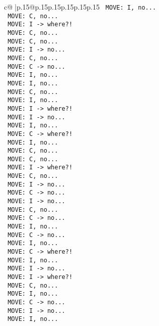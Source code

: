 \documentclass{article}
\begin{document}
{\begin{supertabular}{c@{$\;$}|p{.15\linewidth}@{}p{.15\linewidth}p{.15\linewidth}p{.15\linewidth}p{.15\linewidth}p{.15\linewidth}}
{{{\texttt{ MOVE: I, no...} \\
\texttt{ MOVE: C, no...} \\
\texttt{ MOVE: I {-}> where?!} \\
\texttt{ MOVE: C, no...} \\
\texttt{ MOVE: C, no...} \\
\texttt{ MOVE: I {-}> no...} \\
\texttt{ MOVE: C, no...} \\
\texttt{ MOVE: C {-}> no...} \\
\texttt{ MOVE: I, no...} \\
\texttt{ MOVE: I, no...} \\
\texttt{ MOVE: C, no...} \\
\texttt{ MOVE: I, no...} \\
\texttt{ MOVE: I {-}> where?!} \\
\texttt{ MOVE: I {-}> no...} \\
\texttt{ MOVE: I, no...} \\
\texttt{ MOVE: C {-}> where?!} \\
\texttt{ MOVE: I, no...} \\
\texttt{ MOVE: C, no...} \\
\texttt{ MOVE: C, no...} \\
\texttt{ MOVE: I {-}> where?!} \\
\texttt{ MOVE: C, no...} \\
\texttt{ MOVE: I {-}> no...} \\
\texttt{ MOVE: C {-}> no...} \\
\texttt{ MOVE: I {-}> no...} \\
\texttt{ MOVE: C, no...} \\
\texttt{ MOVE: C {-}> no...} \\
\texttt{ MOVE: I, no...} \\
\texttt{ MOVE: C {-}> no...} \\
\texttt{ MOVE: I, no...} \\
\texttt{ MOVE: C {-}> where?!} \\
\texttt{ MOVE: I, no...} \\
\texttt{ MOVE: I {-}> no...} \\
\texttt{ MOVE: I {-}> where?!} \\
\texttt{ MOVE: C, no...} \\
\texttt{ MOVE: I, no...} \\
\texttt{ MOVE: C {-}> no...} \\
\texttt{ MOVE: I {-}> no...} \\
\texttt{ MOVE: I, no...} \\
}}}
\end{supertabular}}
\end{document}
